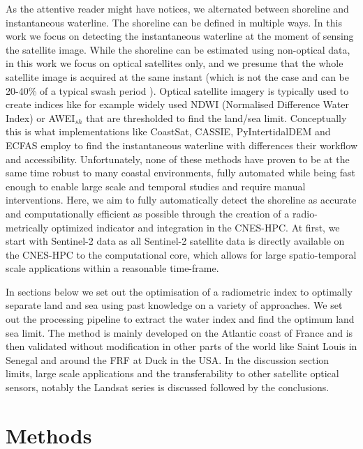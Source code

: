 \documentclass[remotesensing,article,submit,pdftex,moreauthors]{Definitions/mdpi}
\begin{document}
As the attentive reader might have notices, we alternated between shoreline and instantaneous waterline. The shoreline can be defined in multiple ways. In this work we focus on detecting the instantaneous waterline at the moment of sensing the satellite image. While the shoreline can be estimated using non-optical data, in this work we focus on optical satellites only, and we presume that the whole satellite image is acquired at the same instant (which is not the case and can be 20-40\% of a typical swash period \citep{binet2022accurate}). Optical satellite imagery is typically used to create indices like for example widely used NDWI (Normalised Difference Water Index) or AWEI$_{sh}$ that are thresholded to find the land/sea limit. Conceptually this is what implementations like CoastSat\citep{VOS2019_google}, CASSIE\citep{ALMEIDA2021_Cassie}, PyIntertidalDEM\citep{Khan2019} and ECFAS employ to find the instantaneous waterline with differences their workflow and accessibility. Unfortunately, none of these methods have proven to be at the same time robust to many coastal environments, fully automated while being fast enough to enable large scale and temporal studies and require manual interventions. Here, we aim to fully automatically detect the shoreline as accurate and computationally efficient as possible through the creation of a radio-metrically optimized indicator and integration in the CNES-HPC. At first, we start with Sentinel-2 data as all Sentinel-2 satellite data is directly available on the CNES-HPC to the computational core, which allows for large spatio-temporal scale applications within a reasonable time-frame.

In sections below we set out the optimisation of a radiometric index to optimally separate land and sea using past knowledge on a variety of approaches. We set out the processing pipeline to extract the water index and find the optimum land sea limit. The method is mainly developed on the Atlantic coast of France and is then validated without modification in other parts of the world like Saint Louis in Senegal and around the FRF at Duck in the USA. In the discussion section limits, large scale applications and the transferability to other satellite optical sensors, notably the Landsat series is discussed followed by the conclusions.

\section{Methods}
\end{document}
